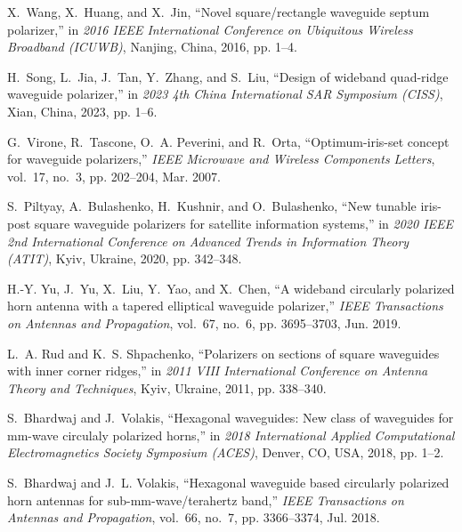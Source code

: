 \documentclass[journal,9pt]{IEEEtran}
\begin{document}
\begin{thebibliography}{99}
    X.~Wang, X.~Huang, and X.~Jin, ``Novel square/rectangle waveguide septum polarizer,'' in \emph{2016 IEEE International Conference on Ubiquitous Wireless Broadband (ICUWB)}, Nanjing, China, 2016, pp. 1--4.

    H.~Song, L.~Jia, J.~Tan, Y.~Zhang, and S.~Liu, ``Design of wideband quad-ridge waveguide polarizer,'' in \emph{2023 4th China International SAR Symposium (CISS)}, Xian, China, 2023, pp. 1--6.

    G.~Virone, R.~Tascone, O.~A. Peverini, and R.~Orta, ``Optimum-iris-set concept for waveguide polarizers,'' \emph{IEEE Microwave and Wireless Components Letters}, vol.~17, no.~3, pp. 202--204, Mar. 2007.

    S.~Piltyay, A.~Bulashenko, H.~Kushnir, and O.~Bulashenko, ``New tunable iris-post square waveguide polarizers for satellite information systems,'' in \emph{2020 IEEE 2nd International Conference on Advanced Trends in Information Theory (ATIT)}, Kyiv, Ukraine, 2020, pp. 342--348.

    H.-Y. Yu, J.~Yu, X.~Liu, Y.~Yao, and X.~Chen, ``A wideband circularly polarized horn antenna with a tapered elliptical waveguide polarizer,'' \emph{IEEE Transactions on Antennas and Propagation}, vol.~67, no.~6, pp. 3695--3703, Jun. 2019.

    L.~A. Rud and K.~S. Shpachenko, ``Polarizers on sections of square waveguides with inner corner ridges,'' in \emph{2011 VIII International Conference on Antenna Theory and Techniques}, Kyiv, Ukraine, 2011, pp. 338--340.

    S.~Bhardwaj and J.~Volakis, ``Hexagonal waveguides: New class of waveguides for mm-wave circulaly polarized horns,'' in \emph{2018 International Applied Computational Electromagnetics Society Symposium (ACES)}, Denver, CO, USA, 2018, pp. 1--2.

    S.~Bhardwaj and J.~L. Volakis, ``Hexagonal waveguide based circularly polarized horn antennas for sub-mm-wave/terahertz band,'' \emph{IEEE Transactions on Antennas and Propagation}, vol.~66, no.~7, pp. 3366--3374, Jul. 2018.


\end{thebibliography}
\end{document}
